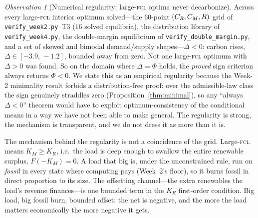\documentclass[11pt,reqno]{amsart}
\theoremstyle{plain}
\theoremstyle{definition}
\theoremstyle{remark}
\theoremstyle{remark}\newtheorem{observation}{Observation}
\newcommand{\KR}{K_R}\newcommand{\KF}{K_F}\newcommand{\KM}{K_M}
\begin{document}
\begin{observation}[Numerical regularity: large-\textsc{fcl} optima never decarbonize]
\label{prop:alwaysup}
Across every large-\textsc{fcl} interior optimum solved---the $60$-point $(C_R,C_M,R)$ grid of
\texttt{verify\_week2.py}~T3 ($16$ solved equilibria), the distribution library of
\texttt{verify\_week4.py}, the double-margin equilibrium of \texttt{verify\_double\_margin.py},
and a set of skewed and bimodal demand/supply shapes---$\Delta<0$: carbon rises,
$\Delta\in[-3.9,\,-1.2]$, bounded away from zero. Not one
large-\textsc{fcl} optimum with $\Delta>0$ was found. So on the domain where $\Delta=\Phi$
holds, the \emph{proved} sign criterion always returns $\Phi<0$. We state this as an empirical
regularity because the Week-2 minimality result forbids a distribution-free proof: over the
admissible-law class the sign genuinely straddles zero (Proposition~\ref{thm:minimal}), so any
``always $\Delta<0$'' theorem would have to exploit optimum-consistency of the conditional
means in a way we have not been able to make general. The regularity is strong, the mechanism
is transparent, and we do not dress it as more than it is.
\end{observation}

The mechanism behind the regularity is not a coincidence of the grid. Large-\textsc{fcl} means
$\KM\ge\KR$, i.e.\
the load is deep enough to swallow the entire renewable surplus, $F(-\KM)=0$. A load that big
is, under the unconstrained rule, run on \emph{fossil} in every state where computing pays
(Week~2's floor), so it burns fossil in direct proportion to its size. The offsetting
channel---the extra renewables the load's revenue finances---is one bounded term in the $\KR$
first-order condition. Big load, big fossil burn, bounded offset: the net is negative, and
the more the load matters economically the more negative it gets.
\end{document}
